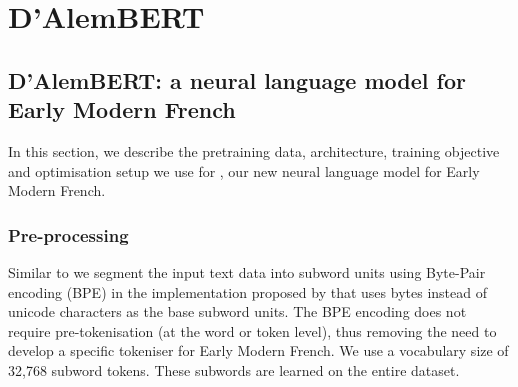 \chapter{D'AlemBERT}





\section{D'AlemBERT: a neural language model for Early Modern French}\label{sec:dAlemBERT}
In this section, we describe the pretraining data, architecture, training objective and optimisation setup we use for \dalembert, our new neural language model for Early Modern French.


\subsection{Pre-processing}
Similar to \roberta \cite{liu-etal-2019-roberta} we segment the input text data into subword units using Byte-Pair encoding (BPE) \cite{sennrich-etal-2016-neural} in the implementation proposed by \cite{radford-etal-2019-language} that uses bytes instead of unicode characters as the base subword units. The BPE encoding does not require pre-tokenisation (at the word or token level), thus removing the need to develop a specific tokeniser for Early Modern French. We use a vocabulary size of 32,768 subword tokens. These subwords are learned on the entire \freemmax dataset.


